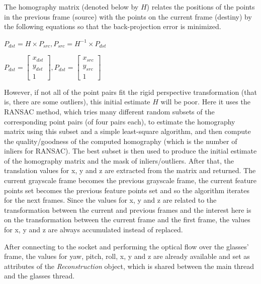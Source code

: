 \documentclass[msc, a4paper, classic, en]{ufbathesis}
\begin{document}
The homography matrix (denoted below by $H$) relates the positions of the points in the previous frame (source) with the points on the current frame (destiny) by the following equations \cite{bradski2008learning} so that the back-projection error is minimized.

\begin{center}
$P_{dst} = H \times P_{src}, P_{src} = H^{-1} \times P_{dst}$
\end{center}

\begin{center}
$P_{dst} = \begin{bmatrix} x_{dst} \\ y_{dst} \\ 1 \end{bmatrix}, P_{dst} = \begin{bmatrix} x_{src} \\ y_{src} \\ 1 \end{bmatrix}$
\end{center}

However, if not all of the point pairs fit the rigid perspective transformation (that is, there are some outliers), this initial estimate $H$ will be poor. Here it uses the RANSAC method, which tries many different random subsets of the corresponding point pairs (of four pairs each), to estimate the homography matrix using this subset and a simple least-square algorithm, and then compute the quality/goodness of the computed homography (which is the number of inliers for RANSAC). The best subset is then used to produce the initial estimate of the homography matrix and the mask of inliers/outliers. After that, the translation values for x, y and z are extracted from the matrix and returned. The current grayscale frame becomes the previous grayscale frame, the current feature points set becomes the previous feature points set and so the algorithm iterates for the next frames. Since the values for x, y and z are related to the transformation between the current and previous frames and the interest here is on the transformation between the current frame and the first frame, the values for x, y and z are always accumulated instead of replaced.

After connecting to the socket and performing the optical flow over the glasses' frame, the values for yaw, pitch, roll, x, y and z are already available and set as attributes of the \textit{Reconstruction} object, which is shared between the main thread and the glasses thread.
\end{document}
